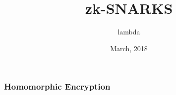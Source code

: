 \documentclass[xetex,mathserif,serif]{beamer}
\title{zk-SNARKS}
\author{lambda}
\institute
{
  ThunderDB
  zeqing.guo@thunderdb.io
}
\date{March, 2018}
\begin{document}
\begin{frame}
  \frametitle{Homomorphic Encryption}
  \end{frame}
\end{document}
